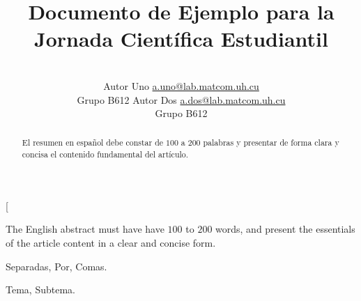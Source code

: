 \documentclass[a4paper,10pt,twocolumn]{article}
\title{Documento de Ejemplo para la Jornada Científica Estudiantil}
\author{\\
\name Autor Uno \email \href{mailto:a.uno@lab.matcom.uh.cu}{a.uno@lab.matcom.uh.cu}
	\\ \addr Grupo B612 \AND
\name Autor Dos \email \href{mailto:a.dos@lab.matcom.uh.cu}{a.dos@lab.matcom.uh.cu}
  \\ \addr Grupo B612}
\begin{document}
\twocolumn[

\maketitle


\begin{abstract}

	El resumen en español debe constar de $100$ a $200$ palabras y presentar de forma
	clara y concisa el contenido fundamental del artículo.

\end{abstract}

\vspace{0.5cm}

\begin{enabstract}

  The English abstract must have have $100$ to $200$ words, and present 
  the essentials of the article content in a clear and concise form.

\end{enabstract}

\begin{keywords}
	Separadas,
	Por,
	Comas.
\end{keywords}

\begin{topics}
	Tema, Subtema.
\end{topics}
\end{document}
